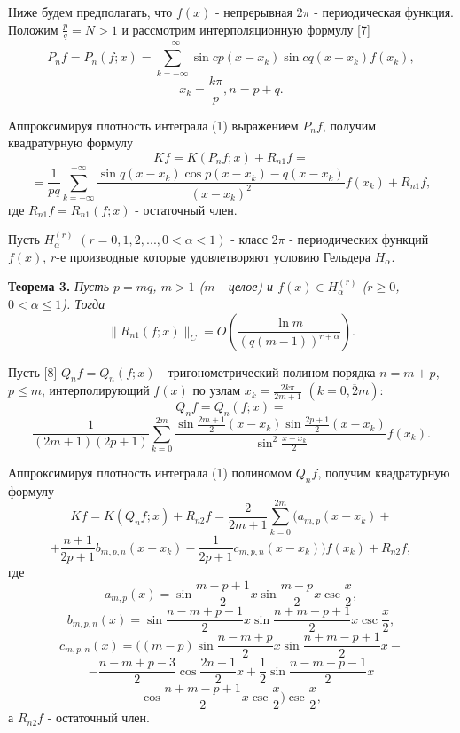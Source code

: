 Ниже будем предполагать, что $f(x)$ - непрерывная 2$\pi$ - периодическая функция. Положим $\frac{p}{q} = N > 1$ и рассмотрим интерполяционную формулу [7]
$$ P_{n} f = P_n (f;x) = \sum_{k=-\infty}^{+\infty}\sin{c p \left(x - x_k \right)} \sin{c q \left(x - x_k\right)} f\left(x_k\right),$$
$$x_k = \frac{k\pi}{p}, n = p +q.$$

Аппроксимируя плотность интеграла (1) выражением $P_n f$, получим квадратурную формулу
$$ Kf=K(P_n f;x) + R_{n1} f = $$
$$=\frac{1}{p q} \sum_{ k = - \infty}^{+ \infty}\frac{ \sin{q (x-x_k)} \cos{p (x-x_k)}-q(x-x_k)}{(x-x_k)^2}f(x_k)+R_{n1} f, $$
где $R_{n1} f = R_{n1}(f;x)$ - остаточный член.

Пусть $H_{\alpha}^{(r)}$ $(r=0, 1, 2, ..., 0 < \alpha < 1)$ - класс 2$\pi$ - периодических функций $f(x)$, $r$-е производные которые удовлетворяют условию Гельдера $H_{\alpha}$.

\textbf{Теорема 3.} {\it Пусть $p=m q$, $m > 1$ ($m$ - целое) и $f(x) \in H_{\alpha}^{(r)}$ ($r \geq 0$, $0 < \alpha \leq 1$). Тогда}
\begin{displaymath}
\|R_{n1}(f;x)\|_C = O\left(\frac{\ln{m}}{(q(m-1))^{r+\alpha}}\right).
\end{displaymath}

Пусть [8] $Q_n f = Q_n (f;x)$ - тригонометрический полином порядка $n=m+p$, $p \leq m$, интерполирующий $f(x)$ по узлам $x_k = \frac{2 k \pi}{2m+1}$ $\left(k=\overline{0,2m}\right)$:
$$Q_n f = Q_n (f;x) =$$
$$\frac{1}{(2m+1)(2p+1)} \sum_{k=0}^{2m} \frac{\sin{\frac{2m+1}{2}}(x-x_k) \sin{\frac{2p+1}{2}}(x-x_k)}{\sin^2{\frac{x-x_k}{2}}}f(x_k).$$

Аппроксимируя плотность интеграла (1) полиномом $Q_n f$, получим квадратурную формулу
$$ Kf=K(Q_n f;x) + R_{n2} f = \frac{2}{2m+1} \sum_{k=0}^{2m}(a_{m,p} (x-x_k)+$$
$$ + \frac{n+1}{2p+1}b_{m,p,n} (x-x_k)-\frac{1}{2p+1} {c_{m,p,n}(x-x_k))f(x_k)}+R_{n2} f, $$
где
\begin{displaymath}
a_{m,p}(x) = \sin{\frac{m-p+1}{2}}x\sin{\frac{m-p}{2}}x\csc{\frac{x}{2}},
\end{displaymath}
\begin{displaymath}
b_{m,p,n}(x)=\sin{\frac{n-m+p-1}{2}}x\sin{\frac{n+m-p+1}{2}}x\csc{\frac{x}{2}},
\end{displaymath}
$$c_{m,p,n}(x)=((m-p)\sin{\frac{n-m+p}{2}}x\sin{\frac{n+m-p+1}{2}}x-$$
$$ - \frac{n-m+p-3}{2}\cos{\frac{2n-1}{2}}x+ \frac{1}{2}\sin{\frac{n-m+p-1}{2}}x$$
$$\cos{\frac{n+m-p+1}{2}} x\csc{\frac{x}{2}})\csc{\frac{x}{2}},$$
а $R_{n2}f$ - остаточный член.

